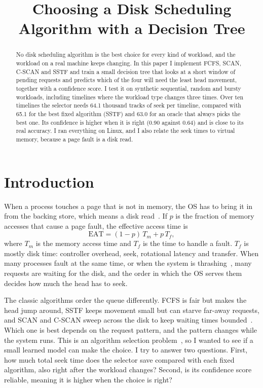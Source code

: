 \documentclass[conference]{IEEEtran}
\begin{document}
\title{Choosing a Disk Scheduling Algorithm with a Decision Tree}

\author{\vspace{-3em}}

\maketitle

\begin{abstract}
No disk scheduling algorithm is the best choice for every kind of workload, and the workload on a real machine keeps changing. In this paper I implement FCFS, SCAN, C-SCAN and SSTF and train a small decision tree that looks at a short window of pending requests and predicts which of the four will need the least head movement, together with a confidence score. I test it on synthetic sequential, random and bursty workloads, including timelines where the workload type changes three times. Over ten timelines the selector needs 64.1 thousand tracks of seek per timeline, compared with 65.1 for the best fixed algorithm (SSTF) and 63.0 for an oracle that always picks the best one. Its confidence is higher when it is right (0.90 against 0.64) and is close to its real accuracy. I ran everything on Linux, and I also relate the seek times to virtual memory, because a page fault is a disk read.
\end{abstract}

\section{Introduction}
When a process touches a page that is not in memory, the OS has to bring it in from the backing store, which means a disk read~\cite{silberschatz}. If $p$ is the fraction of memory accesses that cause a page fault, the effective access time is
\begin{equation}
\mathrm{EAT} = (1-p)\,T_m + p\,T_f ,
\label{eq:eat}
\end{equation}
where $T_m$ is the memory access time and $T_f$ is the time to handle a fault. $T_f$ is mostly disk time: controller overhead, seek, rotational latency and transfer. When many processes fault at the same time, or when the system is thrashing~\cite{denning68}, many requests are waiting for the disk, and the order in which the OS serves them decides how much the head has to seek.

The classic algorithms order the queue differently. FCFS is fair but makes the head jump around, SSTF keeps movement small but can starve far-away requests, and SCAN and C-SCAN sweep across the disk to keep waiting times bounded~\cite{denning67,teorey72,seltzer90}. Which one is best depends on the request pattern, and the pattern changes while the system runs. This is an algorithm selection problem~\cite{rice76}, so I wanted to see if a small learned model can make the choice. I try to answer two questions. First, how much total seek time does the selector save compared with each fixed algorithm, also right after the workload changes? Second, is its confidence score reliable, meaning it is higher when the choice is right?
\end{document}
